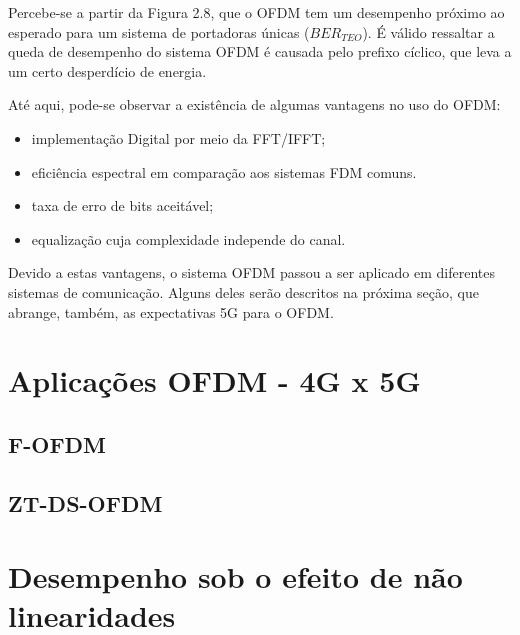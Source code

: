 \par Percebe-se a partir da Figura 2.8, que o OFDM tem um desempenho próximo ao esperado para um sistema de portadoras únicas ($BER_{TEO}$). É válido ressaltar a queda de desempenho do sistema OFDM é causada pelo prefixo cíclico, que leva a um certo desperdício de energia.  
\par Até aqui, pode-se observar a existência de algumas vantagens no uso do OFDM:
\begin{itemize}	
    \item implementação Digital por meio da FFT/IFFT;
	\item eficiência espectral em comparação aos sistemas FDM comuns.
	\item taxa de erro de bits aceitável;
	\item equalização cuja complexidade independe do canal.
\end{itemize}   
\par Devido a estas vantagens, o sistema OFDM passou a ser aplicado em diferentes sistemas de comunicação. Alguns deles serão descritos na próxima seção, que abrange, também, as expectativas 5G para o OFDM.

\section{Aplicações OFDM - 4G x 5G}

\subsection{F-OFDM}
\subsection{ZT-DS-OFDM}



\section{Desempenho sob o efeito de não linearidades }
 



